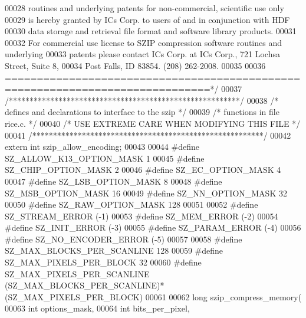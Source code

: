 \begin{DoxyCode}
00028 \textcolor{comment}{routines and underlying patents for non-commercial, scientific use only }
00029 \textcolor{comment}{is hereby granted by ICs Corp. to users of and in conjunction with HDF }
00030 \textcolor{comment}{data storage and retrieval file format and software library products.}
00031 \textcolor{comment}{}
00032 \textcolor{comment}{For commercial use license to SZIP compression software routines and underlying }
00033 \textcolor{comment}{patents please contact ICs Corp. at ICs Corp., 721 Lochsa Street, Suite 8,}
00034 \textcolor{comment}{Post Falls, ID 83854.  (208) 262-2008.}
00035 \textcolor{comment}{}
00036 \textcolor{comment}{==============================================================================*/}
00037 \textcolor{comment}{/********************************************************/}
00038 \textcolor{comment}{/* defines and declarations to interface to the szip    */}
00039 \textcolor{comment}{/* functions in file rice.c.                            */}
00040 \textcolor{comment}{/* USE EXTREME CARE WHEN MODIFYING THIS FILE            */}
00041 \textcolor{comment}{/********************************************************/}
00042 \textcolor{keyword}{extern} \textcolor{keywordtype}{int} szip\_allow\_encoding;
00043 
00044 \textcolor{preprocessor}{#define SZ\_ALLOW\_K13\_OPTION\_MASK         1}
00045 \textcolor{preprocessor}{#define SZ\_CHIP\_OPTION\_MASK              2 }
00046 \textcolor{preprocessor}{#define SZ\_EC\_OPTION\_MASK                4}
00047 \textcolor{preprocessor}{#define SZ\_LSB\_OPTION\_MASK               8}
00048 \textcolor{preprocessor}{#define SZ\_MSB\_OPTION\_MASK              16}
00049 \textcolor{preprocessor}{#define SZ\_NN\_OPTION\_MASK               32}
00050 \textcolor{preprocessor}{#define SZ\_RAW\_OPTION\_MASK             128}
00051 
00052 \textcolor{preprocessor}{#define SZ\_STREAM\_ERROR     (-1)}
00053 \textcolor{preprocessor}{#define SZ\_MEM\_ERROR        (-2)}
00054 \textcolor{preprocessor}{#define SZ\_INIT\_ERROR       (-3)}
00055 \textcolor{preprocessor}{#define SZ\_PARAM\_ERROR      (-4)}
00056 \textcolor{preprocessor}{#define SZ\_NO\_ENCODER\_ERROR (-5)}
00057 
00058 \textcolor{preprocessor}{#define SZ\_MAX\_BLOCKS\_PER\_SCANLINE            128}
00059 \textcolor{preprocessor}{#define SZ\_MAX\_PIXELS\_PER\_BLOCK                32}
00060 \textcolor{preprocessor}{#define SZ\_MAX\_PIXELS\_PER\_SCANLINE     (SZ\_MAX\_BLOCKS\_PER\_SCANLINE)*(SZ\_MAX\_PIXELS\_PER\_BLOCK)}
00061 
00062 \textcolor{keywordtype}{long} szip\_compress\_memory(
00063     \textcolor{keywordtype}{int} options\_mask,
00064     \textcolor{keywordtype}{int} bits\_per\_pixel,

\end{DoxyCode}
